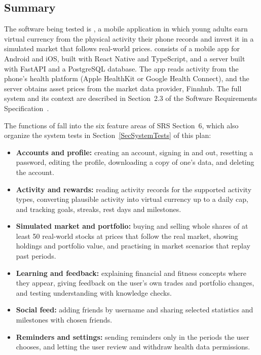 \documentclass[12pt, titlepage]{article}
\begin{document}
\subsection{Summary}


The software being tested is \progname{}, a mobile application in which
young adults earn virtual currency from the physical activity their phone
records and invest it in a simulated market that follows real-world prices.
\progname{} consists of a mobile app for Android and iOS, built with React
Native and TypeScript, and a server built with FastAPI and a PostgreSQL
database. The app reads activity from the phone's health platform (Apple
HealthKit or Google Health Connect), and the server obtains asset prices from
the market data provider, Finnhub. The full system and its context are
described in Section~2.3 of the Software Requirements
Specification~\citep[SRS;][]{SRS0}.

The functions of \progname{} fall into the six feature areas of SRS
Section~6, which also organize the system tests in Section~\ref{SecSystemTests}
of this plan:

\begin{itemize}
  \item \textbf{Accounts and profile:} creating an account, signing in and out,
        resetting a password, editing the profile, downloading a copy of one's
        data, and deleting the account.
  \item \textbf{Activity and rewards:} reading activity records for the
        supported activity types, converting plausible activity into virtual
        currency up to a daily cap, and tracking goals, streaks, rest days and
        milestones.
  \item \textbf{Simulated market and portfolio:} buying and selling whole shares
        of at least 50 real-world stocks at prices that follow the real market,
        showing holdings and portfolio value, and practising in market scenarios
        that replay past periods.
  \item \textbf{Learning and feedback:} explaining financial and fitness
        concepts where they appear, giving feedback on the user's own trades and
        portfolio changes, and testing understanding with knowledge checks.
  \item \textbf{Social feed:} adding friends by username and sharing selected
        statistics and milestones with chosen friends.
  \item \textbf{Reminders and settings:} sending reminders only in the periods
        the user chooses, and letting the user review and withdraw health data
        permissions.
\end{itemize}
\end{document}
